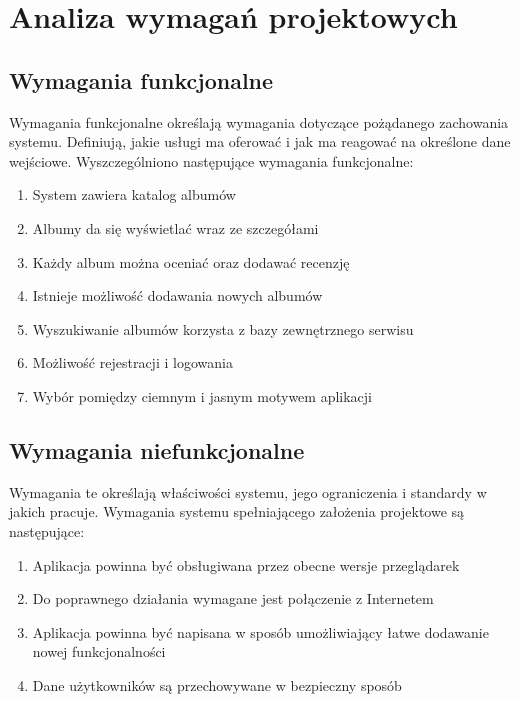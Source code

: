 
\chapter{Analiza wymagań projektowych}

\section{Wymagania funkcjonalne}
	Wymagania funkcjonalne określają wymagania dotyczące pożądanego zachowania systemu.
	Definiują, jakie usługi ma oferować i jak ma reagować na określone dane wejściowe.
	Wyszczególniono następujące wymagania funkcjonalne:
	\begin{enumerate}
		\item System zawiera katalog albumów
		\item Albumy da się wyświetlać wraz ze szczegółami
		\item Każdy album można oceniać oraz dodawać recenzję
		\item Istnieje możliwość dodawania nowych albumów
		\item Wyszukiwanie albumów korzysta z bazy zewnętrznego serwisu
		\item Możliwość rejestracji i logowania
		\item Wybór pomiędzy ciemnym i jasnym motywem aplikacji
	\end{enumerate}

\section{Wymagania niefunkcjonalne}
	Wymagania te określają właściwości systemu, jego ograniczenia i standardy w jakich pracuje.
	Wymagania systemu spełniającego założenia projektowe są następujące:
	\begin{enumerate}
		\item Aplikacja powinna być obsługiwana przez obecne wersje przeglądarek
		\item Do poprawnego działania wymagane jest połączenie z Internetem
		\item Aplikacja powinna być napisana w sposób umożliwiający łatwe dodawanie nowej funkcjonalności
		\item Dane użytkowników są przechowywane w bezpieczny sposób
	\end{enumerate}

